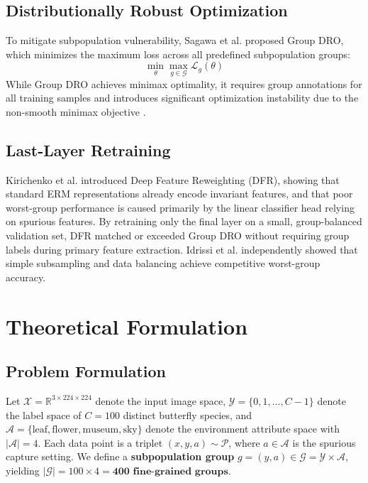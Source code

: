 \documentclass[10pt,journal,compsoc]{IEEEtran}
\begin{document}
\subsection{Distributionally Robust Optimization}
To mitigate subpopulation vulnerability, Sagawa et al. \cite{sagawa2020groupdro} proposed Group DRO, which minimizes the maximum loss across all predefined subpopulation groups:
\begin{equation}
\min_\theta \max_{g \in \mathcal{G}} \mathcal{L}_g(\theta)
\end{equation}
While Group DRO achieves minimax optimality, it requires group annotations for all training samples and introduces significant optimization instability due to the non-smooth minimax objective \cite{koh2021wilds}.

\subsection{Last-Layer Retraining}
Kirichenko et al. \cite{kirichenko2023dfr} introduced Deep Feature Reweighting (DFR), showing that standard ERM representations already encode invariant features, and that poor worst-group performance is caused primarily by the linear classifier head relying on spurious features. By retraining only the final layer on a small, group-balanced validation set, DFR matched or exceeded Group DRO without requiring group labels during primary feature extraction. Idrissi et al. \cite{idrissi2022clear} independently showed that simple subsampling and data balancing achieve competitive worst-group accuracy.

\section{Theoretical Formulation}

\subsection{Problem Formulation}
Let $\mathcal{X} = \mathbb{R}^{3 \times 224 \times 224}$ denote the input image space, $\mathcal{Y} = \{0, 1, \dots, C-1\}$ denote the label space of $C = 100$ distinct butterfly species, and $\mathcal{A} = \{\text{leaf}, \text{flower}, \text{museum}, \text{sky}\}$ denote the environment attribute space with $|\mathcal{A}| = 4$. Each data point is a triplet $(x, y, a) \sim \mathcal{P}$, where $a \in \mathcal{A}$ is the spurious capture setting. We define a \textbf{subpopulation group} $g = (y, a) \in \mathcal{G} = \mathcal{Y} \times \mathcal{A}$, yielding $|\mathcal{G}| = 100 \times 4 = \mathbf{400 \text{ fine-grained groups}}$.
\end{document}

